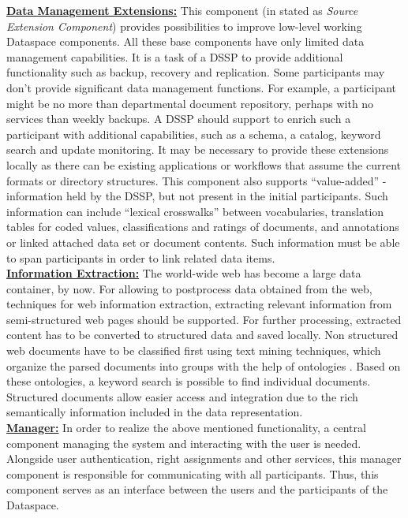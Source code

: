 \uline{\textbf{Data Management Extensions:}} This component (in \cite{Halevy:2006:PDS:1142351.1142352} stated as \textit{Source Extension Component}) provides possibilities to improve low-level working Dataspace components. All these base components have only limited data management capabilities. It is a task of a DSSP to provide additional functionality such as backup, recovery and replication. Some participants may don't provide significant data management functions. For example, a participant might be no more than departmental document repository, perhaps with no services than weekly backups. A DSSP should support to enrich such a participant with additional capabilities, such as a schema, a catalog, keyword search and update monitoring. It may be necessary to provide these extensions locally as there can be existing applications or workflows that assume the current formats or directory structures.	
This component also supports ``value-added'' - information held by the DSSP, but not present in the initial participants. Such information can include ``lexical crosswalks'' between vocabularies, translation tables for coded values, classifications and ratings of documents, and annotations or linked attached data set or document contents. Such information must be able to span participants in order to link related data items.\\

\uline{\textbf{Information Extraction:}} The world-wide web has become a large data container, by now. For allowing to postprocess data obtained from the web, techniques for web information extraction, extracting relevant information from semi-structured web pages should be supported. For further processing, extracted content has to be converted to structured data and saved locally. Non structured web documents have to be classified first using text mining techniques, which organize the parsed documents into groups with the help of ontologies \cite{conf/wise/HeQZW04}. Based on these ontologies, a keyword search is possible to find individual documents. Structured documents allow easier access and integration due to the rich semantically information included in the data representation.\\

\uline{\textbf{Manager:}} In order to realize the above mentioned functionality, a central component managing the system and interacting with the user is needed. Alongside user authentication, right assignments and other services, this manager component is responsible for communicating with all participants. Thus, this component serves as an interface between the users and the participants of the Dataspace.\\

